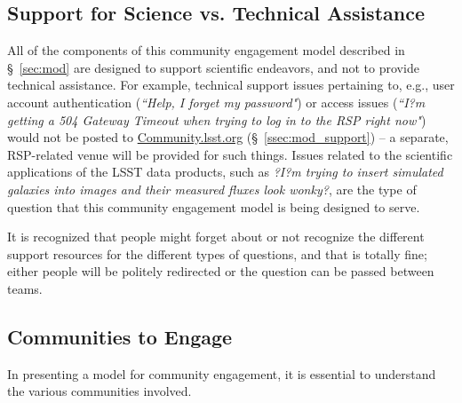 \documentclass[DM,lsstdraft,toc]{lsstdoc}
\begin{document}
\subsection{Support for Science vs. Technical Assistance}\label{ssec:intro_tech}

All of the components of this community engagement model described in \S~\ref{sec:mod} are designed to support scientific endeavors, and not to provide technical assistance.
For example, technical support issues pertaining to, e.g., user account authentication (\textit{``Help, I forget my password"}) or access issues (\textit{``I?m getting a 504 Gateway Timeout when trying to log in to the RSP right now"}) would not be posted to \url{Community.lsst.org} (\S~\ref{ssec:mod_support}) -- a separate, RSP-related venue will be provided for such things.
Issues related to the scientific applications of the LSST data products, such as \textit{?I?m trying to insert simulated galaxies into images and their measured fluxes look wonky?}, are the type of question that this community engagement model is being designed to serve.

It is recognized that people might forget about or not recognize the different support resources for the different types of questions, and that is totally fine; either people will be politely redirected or the question can be passed between teams.


\subsection{Communities to Engage}\label{ssec:intro_comms}

In presenting a model for community engagement, it is essential to understand the various communities involved.
\end{document}
